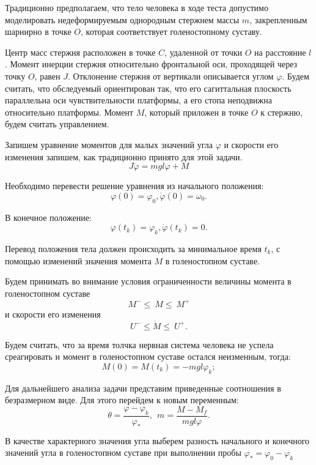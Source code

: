 \documentclass[a4paper,14pt]{article}
\theoremstyle{plain} %
\theoremstyle{definition} %
\theoremstyle{remark} %
\begin{document}
{Традиционно предполагаем, что тело человека в ходе теста допустимо
моделировать недеформируемым однородным стержнем массы $m$,
закрепленным шарнирно в точке $O$, которая соответствует
голеностопному суставу.

Центр масс стержня расположен в точке $C$, удаленной от точки $O$
на расстояние $l$. Момент инерции стержня относительно фронтальной
оси, проходящей через точку $O$, равен $J$. Отклонение стержня от
вертикали описывается углом $\varphi$. Будем считать, что обследуемый
ориентирован так, что его сагиттальная плоскость параллельна оси
чувствительности платформы, а его стопа неподвижна относительно
платформы. Момент $M$, который приложен в точке $O$ к стержню,
будем считать управлением.

Запишем уравнение моментов для малых значений угла $\varphi$ и
скорости его изменения запишем, как традиционно принято для этой задачи.
\begin{equation}\label{6}
    J\ddot{\varphi}= mgl\varphi+M
\end{equation}

Необходимо перевести решение уравнения из начального положения:
\begin{equation}\label{7}
    \varphi(0)=\varphi_0,\dot{\varphi}(0)=\omega_0.
\end{equation}

В конечное положение:
\begin{equation}\label{8}
    \varphi(t_k)=\varphi_k,\dot{\varphi}(t_k)=0.
\end{equation}

Перевод положения тела должен происходить за минимальное
время $t_k$, с помощью изменений значения момента $M$ в
голеностопном суставе.

Будем принимать во внимание условия ограниченности величины
момента в голеностопном суставе
\[
    M^-\le\ M\le\ M^+
\]
и скорости его изменения
\[
    U^-\le\dot{M}\le\ U^+.
\]

Будем считать, что за время толчка нервная система человека
не успела среагировать и момент в голеностопном суставе остался
неизменным, тогда:
\[
    M(0)=M\left(t_k\right)=-mgl\varphi_k;
\]

Для дальнейшего анализа задачи представим приведенные
соотношения в безразмерном виде. Для этого перейдем
к новым переменным:
\[
    \theta=\frac{\varphi-\varphi_k}{\varphi_\ast},\ \ m=\frac{M-M_f}{mgl\varphi}.
\]

В качестве характерного значения угла выберем разность
начального и конечного значений угла в голеностопном
суставе при выполнении пробы $\varphi_\ast=\varphi_0-\varphi_k$

}
\end{document}
